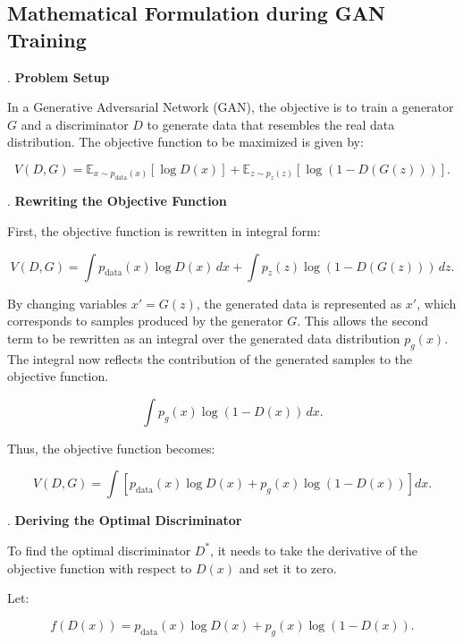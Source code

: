 \subsection{Mathematical Formulation during GAN Training}

. \textbf{Problem Setup}

In a Generative Adversarial Network (GAN), the objective is to train a generator \( G \) and a discriminator \( D \) 
to generate data that resembles the real data distribution. The objective function to be maximized is given by:

\begin{equation}
    V(D, G) = \mathbb{E}_{x \sim p_{\text{data}}(x)} [\log D(x)] + \mathbb{E}_{z \sim p_{z}(z)} [\log (1 - D(G(z)))].
\end{equation}

. \textbf{Rewriting the Objective Function}

First, the objective function is rewritten in integral form:

\begin{equation}
    V(D, G) = \int p_{\text{data}}(x) \log D(x) \, dx + \int p_{z}(z) \log (1 - D(G(z))) \, dz.
\end{equation}

By changing variables $x' = G(z)$, the generated data is represented as $x'$, which corresponds to samples produced by the generator $G$. This allows the second term to be rewritten as an integral over the generated data distribution $p_g(x)$. The integral now reflects the contribution of the generated samples to the objective function.

\begin{equation}
    \int p_g(x) \log (1 - D(x)) \, dx.
\end{equation}

Thus, the objective function becomes:

\begin{equation}
    V(D, G) = \int \left[ p_{\text{data}}(x) \log D(x) + p_g(x) \log (1 - D(x)) \right] dx.
\end{equation}

. \textbf{Deriving the Optimal Discriminator}

To find the optimal discriminator \( D^* \), it needs to take the derivative of the objective function with respect to \( D(x) \) and set it to zero.

Let:

\begin{equation}
    f(D(x)) = p_{\text{data}}(x) \log D(x) + p_g(x) \log (1 - D(x)).
\end{equation}

